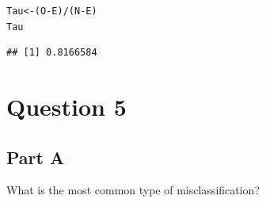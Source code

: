 \documentclass{article}\usepackage[]{graphicx}\usepackage[]{color}
\makeatletter
\newcommand{\hlopt}[1]{\textcolor[rgb]{0,0,0}{#1}}%
\newcommand{\hlstd}[1]{\textcolor[rgb]{0.345,0.345,0.345}{#1}}%
\newcommand{\hlkwb}[1]{\textcolor[rgb]{0.69,0.353,0.396}{#1}}%
\newenvironment{kframe}{%
 \def\at@end@of@kframe{}%
 \ifinner\ifhmode%
  \def\at@end@of@kframe{\end{minipage}}%
  \begin{minipage}{\columnwidth}%
 \fi\fi%
 \def\FrameCommand##1{\hskip\@totalleftmargin \hskip-\fboxsep
 \colorbox{shadecolor}{##1}\hskip-\fboxsep
     \hskip-\linewidth \hskip-\@totalleftmargin \hskip\columnwidth}%
 \MakeFramed {\advance\hsize-\width
   \@totalleftmargin\z@ \linewidth\hsize
   \@setminipage}}%
 {\par\unskip\endMakeFramed%
 \at@end@of@kframe}
\newenvironment{knitrout}{}{} %
\makeatother
\begin{document}
\begin{knitrout}
\color{fgcolor}\begin{kframe}
\begin{alltt}
\hlstd{Tau} \hlkwb{<-} \hlstd{(O} \hlopt{-} \hlstd{E)}\hlopt{/}\hlstd{(N} \hlopt{-} \hlstd{E)}
\hlstd{Tau}
\end{alltt}
\begin{verbatim}
## [1] 0.8166584
\end{verbatim}
\end{kframe}
\end{knitrout}

\section{Question 5}
\subsection{Part A}
What is the most common type of misclassification?
\end{document}
